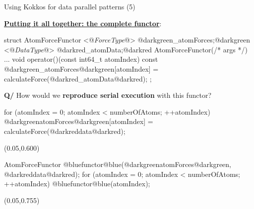 \iffull
\begin{frame}[fragile]{Using Kokkos for data parallel patterns (5)}

  \textbf{\ul{Putting it all together: the complete functor}}:

  \begin{code}[keywords={}, frame=single]
struct AtomForceFunctor {
  <@\emph{ForceType}@> @darkgreen_atomForces;@darkgreen
  <@\emph{DataType}@> @darkred_atomData;@darkred
  AtomForceFunctor(/* args */) {...}
  void operator()(const int64_t atomIndex) const {
    @darkgreen_atomForces@darkgreen[atomIndex] = calculateForce(@darkred_atomData@darkred);
  }
};
  \end{code}

  \vspace{5pt}
  \pause

  \textbf{Q/} How would we \textbf{reproduce serial execution} with this functor?

  \vspace{3pt}

  \begin{code}[keywords={}, frame=single]
for (atomIndex = 0; atomIndex < numberOfAtoms; ++atomIndex){
  @darkgreenatomForces@darkgreen[atomIndex] = calculateForce(@darkreddata@darkred);
}
  \end{code}

  \begin{textblock*}{0.5\textwidth}(0.05\textwidth,0.600\textheight)
  \end{textblock*}

  \pause

  \begin{code}[keywords={}, frame=single]
AtomForceFunctor @bluefunctor@blue(@darkgreenatomForces@darkgreen, @darkreddata@darkred);
for (atomIndex = 0; atomIndex < numberOfAtoms; ++atomIndex){
  @bluefunctor@blue(atomIndex);
}
  \end{code}

  \begin{textblock*}{0.5\textwidth}(0.05\textwidth,0.755\textheight)
  \end{textblock*}

\end{frame}
\fi


